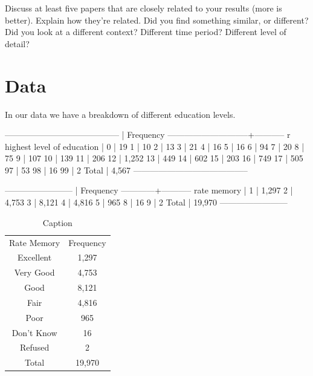 \documentclass{article}
\begin{document}
Discuss at least five papers that are closely related to your results (more is better). Explain how they're related. Did you find something similar, or different? Did you look at a different context? Different time period? Different level of detail?

\section{Data}
\label{sec:data}


In our data we have a breakdown of different education levels. 

-----------------------------------------
                             |  Frequency
-----------------------------+-----------
r highest level of education |           
  0                          |         19
  1                          |         10
  2                          |         13
  3                          |         21
  4                          |         16
  5                          |         16
  6                          |         94
  7                          |         20
  8                          |         75
  9                          |        107
  10                         |        139
  11                         |        206
  12                         |      1,252
  13                         |        449
  14                         |        602
  15                         |        203
  16                         |        749
  17                         |        505
  97                         |         53
  98                         |         16
  99                         |          2
  Total                      |      4,567
-----------------------------------------

------------------------
            |  Frequency
------------+-----------
rate memory |           
  1         |      1,297
  2         |      4,753
  3         |      8,121
  4         |      4,816
  5         |        965
  8         |         16
  9         |          2
  Total     |     19,970
------------------------

\begin{table}
    \centering
    \begin{tabular}{cc}
         Rate Memory& Frequency\\
         Excellent& 1,297\\
         Very Good& 4,753\\
         Good& 8,121\\
         Fair& 4,816\\
         Poor& 965\\
         Don't Know& 16\\
         Refused& 2\\
         Total& 19,970\\
    \end{tabular}
    \caption{Caption}
    \label{tab:my_label}
\end{table}
\end{document}
